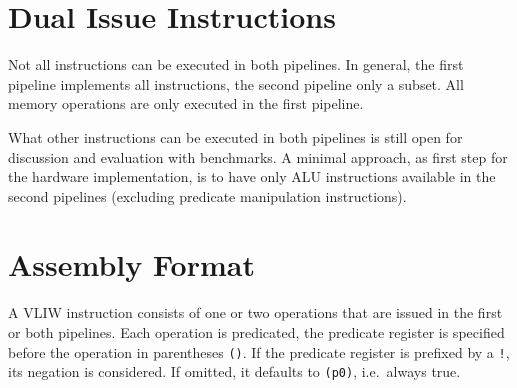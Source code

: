 \documentclass[a4paper,fontsize=10pt,twoside,DIV15,BCOR12mm,headinclude=true,footinclude=false,pagesize,bibtotoc]{scrbook}
\newcommand{\comment}[3]{

\textsf{\textbf{#1}} {\color{#3}#2}}
\newcommand{\martin}[1]{\comment{Martin}{#1}{Blue}}
\newcommand{\stefan}[1]{\comment{Stefan}{#1}{RoyalPurple}}
\renewcommand{\martin}[1]{}
\renewcommand{\stefan}[1]{}
\begin{document}

\clearpage
\section{Dual Issue Instructions}

Not all instructions can be executed in both pipelines. In general, the first
pipeline implements all instructions, the second pipeline only a subset.
All memory operations are only executed in the first pipeline.

What other instructions can be executed in both pipelines is still open for
discussion and evaluation with benchmarks. A minimal approach, as first
step for the hardware implementation, is to have only ALU instructions
available in the second pipelines (excluding predicate manipulation instructions).

\stefan{From what I see in the code, it might also help a lot to allow SWS in the
second pipeline, as they are quite common. Predicate instructions are not that common
now but this will change with the new single-path passes.

This section should also talk about hazards, i.e., can we predicate the second
slot with something that we write in the first slot, what if we use a GP register
in both slots and write to it, ... }

\martin{TODO: agree that we/I should write more on this. Currently
Wolfgang has implemented ALU and predicate operations in both
pipelines. More details shall be described.}

\stefan{Is MFS/MTS allowed in both pipelines (and at the same time)? Should be helpful for prologue/epiloge code,
especially when we move return infos back to special registers.}


\section{Assembly Format}

\martin{This is not pasim, right?}

A VLIW instruction consists of one or two operations that are issued in the first or both pipelines.
Each operation is predicated, the predicate register is specified before the operation in parentheses \texttt{()}.
If the predicate register is prefixed by a \texttt{!}, its negation is considered.
If omitted, it defaults to \texttt{(p0)}, i.e.\ always true.
\end{document}
